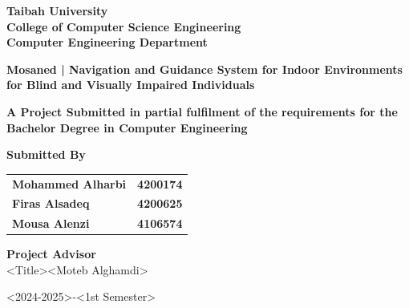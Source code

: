 \begin{titlepage}
    {\titlefont \textbf{Taibah University}}\\
    {\titlefont \textbf{College of Computer Science Engineering}}\\
    {\titlefont \textbf{Computer Engineering Department}}\\
    
    \vspace{1.8cm}
    
    {\titlefont \textbf{Mosaned | Navigation and Guidance System for Indoor Environments for Blind and Visually Impaired Individuals}}
    
    \vspace{1.8cm}

    {\titlefont \fontsize{14}{16} \textbf{A Project Submitted in partial fulfilment of the requirements for the Bachelor Degree in Computer Engineering}}
    \vspace{1.8cm}
    
    \vspace{1.2cm}
    
    \begin{minipage}{\textwidth}
    	\centering
    	{\titlefont \textbf{Submitted By}}\\
    	\vspace{1cm}
    	
    	\begin{tabular}{@{}l@{\hskip 4cm}r@{}}
    		{\titlefont \textbf{Mohammed Alharbi}} & {\titlefont \textbf{4200174}} \\
    		{\titlefont \textbf{Firas Alsadeq}} & {\titlefont \textbf{4200625}} \\
    		{\titlefont \textbf{Mousa Alenzi}} & {\titlefont \textbf{4106574}} \\
    	\end{tabular}
    \end{minipage}
    
    \vspace{1.8cm}

    {\selectfont\fontsize{14}{16}\normalfont
    \textbf{Project Advisor}\\
    \textless Title\textgreater \textless Moteb Alghamdi\textgreater
    }
    
    \vspace{2cm}

    {\selectfont\fontsize{14}{16}\normalfont
    \textless 2024-2025\textgreater-\textless 1st Semester\textgreater
    }

\end{titlepage}
